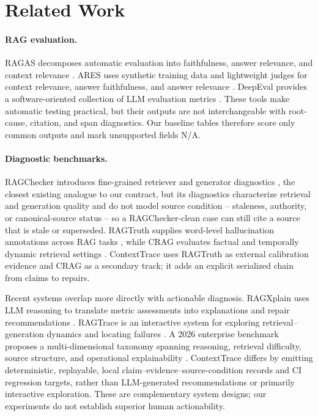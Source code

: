 \section{Related Work}
\paragraph{RAG evaluation.}
RAGAS decomposes automatic evaluation into faithfulness, answer relevance, and
context relevance \citep{es2024ragas}. ARES uses synthetic training data and
lightweight judges for context relevance, answer faithfulness, and answer
relevance \citep{saadfalcon2024ares}. DeepEval provides a software-oriented
collection of LLM evaluation metrics \citep{deepeval2026}. These tools make
automatic testing practical, but their outputs are not interchangeable with
root-cause, citation, and span diagnostics. Our baseline tables therefore score
only common outputs and mark unsupported fields N/A.

\paragraph{Diagnostic benchmarks.}
RAGChecker introduces fine-grained retriever and generator diagnostics
\citep{ru2024ragchecker}, the closest existing analogue to our contract, but
its diagnostics characterize retrieval and generation quality and do not model
source condition -- staleness, authority, or canonical-source status -- so a
RAGChecker-clean case can still cite a source that is stale or superseded.
RAGTruth supplies word-level hallucination annotations
across RAG tasks \citep{niu2024ragtruth}, while CRAG evaluates factual and
temporally dynamic retrieval settings \citep{yang2024crag}. ContextTrace uses
RAGTruth as external calibration evidence and CRAG as a secondary track; it
adds an explicit serialized chain from claims to repairs.

Recent systems overlap more directly with actionable diagnosis. RAGXplain uses
LLM reasoning to translate metric assessments into explanations and repair
recommendations \citep{cohen2025ragxplain}. RAGTrace is an interactive system
for exploring retrieval--generation dynamics and locating failures
\citep{cheng2025ragtrace}. A 2026 enterprise benchmark proposes a
multi-dimensional taxonomy spanning reasoning, retrieval difficulty, source
structure, and operational explainability \citep{narita2026enterprise}.
ContextTrace differs by emitting deterministic, replayable, local
claim--evidence--source-condition records and CI regression targets, rather than
LLM-generated recommendations or primarily interactive exploration. These are
complementary system designs; our experiments do not establish superior human
actionability.


